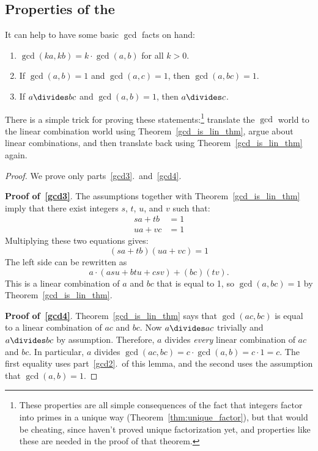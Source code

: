 \begin{editingnotes}
\subsection{Properties of the }

It can help to have some basic $\gcd$ facts on hand:

\begin{lemma}\label{lem:gcd-hold} 
\begin{enumerate}
\item\label{gcd2} $\gcd(k a, k b) = k \cdot \gcd(a, b)$ for all $k > 0$.
\item\label{gcd3} If $\gcd(a, b) = 1$ and $\gcd(a, c) = 1$, then $\gcd(a, bc) = 1$.
\item\label{gcd4} If $a \divides b c$ and $\gcd(a, b) = 1$, then $a \divides c$.

\end{enumerate}
\end{lemma}

There is a simple trick for proving these statements:\footnote{These
  properties are all simple consequences of the fact that integers
  factor into primes in a unique way
  (Theorem~\ref{thm:unique_factor}), but that would be cheating, since
  haven't proved unique factorization yet, and properties like these
  are needed in the proof of that theorem.}  translate the $\gcd$
world to the linear combination world using
Theorem~\ref{gcd_is_lin_thm}, argue about linear combinations, and
then translate back using Theorem~\ref{gcd_is_lin_thm} again.

\begin{proof} We prove only parts~\ref{gcd3}.\ and~\ref{gcd4}.

\textbf{Proof of~\ref{gcd3}}.  The assumptions together with
Theorem~\ref{gcd_is_lin_thm} imply that there exist integers $s$, $t$, $u$,
and $v$ such that:
\begin{align*}
s a + t b & = 1 \\
u a + v c & = 1
\end{align*}
Multiplying these two equations gives:
\[
(s a + t b)(u a + v c) = 1
\]
The left side can be rewritten as
\[
a \cdot (a s u + b t u + c s v) + (bc) (t v).
\]
This is a linear combination of $a$ and $b c$ that is equal to 1, so
$\gcd(a, bc) = 1$ by Theorem~\ref{gcd_is_lin_thm}.

\textbf{Proof of~\ref{gcd4}}.  Theorem~\ref{gcd_is_lin_thm} says that
$\gcd(ac, bc)$ is equal to a linear combination of $ac$ and $bc$.  Now
$a \divides ac$ trivially and $a \divides bc$ by assumption.
Therefore, $a$ divides \emph{every} linear combination of $ac$ and
$bc$.  In particular, $a$ divides $\gcd(ac, bc) = c \cdot \gcd(a, b) =
c\cdot 1 = c$.  The first equality uses part~\ref{gcd2}.\ of this
lemma, and the second uses the assumption that $\gcd(a, b) = 1$.
\end{proof}
\end{editingnotes}

